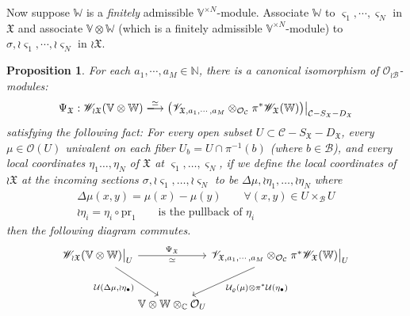 \documentclass[11pt,b5paper,notitlepage]{article}
\theoremstyle{definition}
\theoremstyle{plain}
\newtheorem{pp}[df]{Proposition}
\newcommand{\fk}{\mathfrak}
\newcommand{\mc}{\mathcal}
\newcommand{\SV}{\mathscr{V}}
\newcommand{\sgm}{\varsigma}
\newcommand{\SX}{{S_{\fk X}}}
\newcommand{\DX}{D_{\fk X}}
\newcommand{\Vbb}{\mathbb V}
\newcommand{\Wbb}{\mathbb W}
\newcommand{\Cbb}{\mathbb C}
\newcommand{\Nbb}{\mathbb N}
\newcommand{\pr}{\mathrm {pr}}
\newcommand{\<}{\left\langle}
\renewcommand{\>}{\right\rangle}
\newcommand{\MO}{\mathcal{O}}
\newcommand{\MC}{\mathcal{C}}
\newcommand{\MB}{\mathcal{B}}
\newcommand{\fx}{\mathfrak{X}}
\newcommand{\SW}{\mathscr{W}}
\numberwithin{equation}{subsection}
\begin{document}
Now suppose $\Wbb$ is a \textit{finitely} admissible $\Vbb^{\times N}$-module. Associate $\Wbb$ to $\varsigma_1,\cdots,\varsigma_N$ in $\fx$ and associate $\Vbb\otimes\Wbb$ (which is a finitely admissible $\Vbb^{\times N}$-module) to $\sigma,\wr \varsigma_1,\cdots,\wr\varsigma_N$ in $\wr\fx$. 
\begin{pp}\label{equivalence3}
   For each $a_1,\cdots,a_M\in \Nbb$, there is a canonical isomorphism of $\MO_{\wr \MB}$-modules:
\begin{gather}
\Psi_{\fk X}:   \SW_{\wr\fx}(\Vbb\otimes \Wbb)\xlongrightarrow{\simeq} \big(\SV_{\fx,a_1,\cdots,a_M}\otimes_{\mc O_{\mc C}} \pi^*\SW_\fx(\Wbb)\big)\big|_{\MC-S_\fx-D_\fx}  \label{eq52}
\end{gather}
satisfying the following fact: For every open subset $U\subset\mc C-\SX-\DX$, every  $\mu\in\mc O(U)$ univalent on each fiber $U_b=U\cap\pi^{-1}(b)$ (where $b\in\mc B$), and every  local coordinates $\eta_1\dots,\eta_N$ of $\fk X$ at $\sgm_1,\dots,\sgm_N$, if we define the local coordinates of $\wr{\fk X}$ at the incoming sections $\sigma,\wr\sgm_1,\dots,\wr\sgm_N$ to be $\Delta\mu,\wr\eta_1,\dots,\wr\eta_N$ where
\begin{subequations}\label{eq49}
\begin{gather}
\Delta\mu(x,y)=\mu(x)-\mu(y)\qquad \forall (x,y)\in U\times_\MB U\\
\wr\eta_i=\eta_i\circ\pr_1\qquad\text{is the pullback of }\eta_i
\end{gather}
\end{subequations}
then the following diagram commutes.
   \begin{equation}\label{eq55}
\begin{tikzcd}[column sep=-0.5ex, row sep=3ex]
\mathscr{W}_{\wr\mathfrak{X}}(\mathbb{V}\otimes \mathbb{W})\big|_U \arrow[rrrr, "\Psi_\mathfrak{X}","\simeq"'] \arrow[rrdd, "{\mathcal{U}(\Delta\mu,\wr\eta_\bullet)}"'] &  &                                                    &  & \mathscr{V}_{\mathfrak{X},a_1,\cdots,a_M}\otimes_{\mc O_{\mc C}} \pi^*\mathscr{W}_\mathfrak{X}(\mathbb{W})\big|_U  \arrow[lldd, "\mathcal{U}_\varrho(\mu)\otimes \pi^*\mathcal{U}(\eta_\bullet)"] \\
                                                                                                                                                               &  &                                                    &  &                                                                                                                                                                      \\
                                                                                                                                                               &  & \mathbb{V}\otimes \mathbb{W} \otimes_\Cbb \mathcal{O}_U &  &                                                                                                                                                                     
\end{tikzcd}
\end{equation}
\end{pp}
\end{document}

